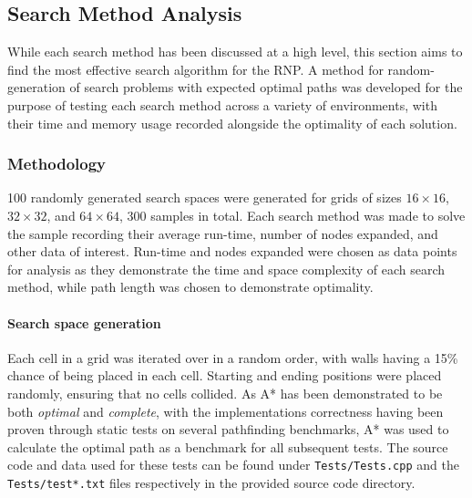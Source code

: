 
\subsection{Search Method Analysis} %
\label{sub:search_method_analysis}
While each search method has been discussed at a high level, this section aims to find the most effective search algorithm for the RNP. A method for random-generation of search problems with expected optimal paths was developed for the purpose of testing each search method across a variety of environments, with their time and memory usage recorded alongside the optimality of each solution.

\subsubsection{Methodology} %
\label{sub:methodology}

100 randomly generated search spaces were generated for grids of sizes $16 \times 16$, $32 \times 32$, and $64 \times 64$, 300 samples in total. Each search method was made to solve the sample recording their average run-time, number of nodes expanded, and other data of interest. Run-time and nodes expanded were chosen as data points for analysis as they demonstrate the time and space complexity of each search method, while path length was chosen to demonstrate optimality.

\paragraph{Search space generation} %
\label{par:search_space_generation}
Each cell in a grid was iterated over in a random order, with walls having a 15\% chance of being placed in each cell. Starting and ending positions were placed randomly, ensuring that no cells collided. As A* has been demonstrated to be both \textit{optimal} and \textit{complete}, with the implementations correctness having been proven through static tests on several pathfinding benchmarks, A* was used to calculate the optimal path as a benchmark for all subsequent tests. The source code and data used for these tests can be found under \texttt{Tests/Tests.cpp} and the \texttt{Tests/test*.txt} files respectively in the provided source code directory.


